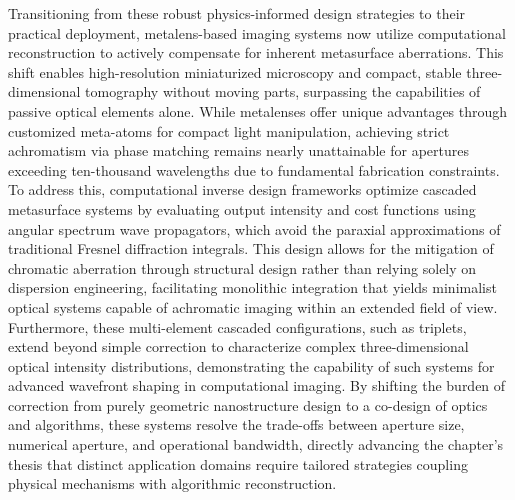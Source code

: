 Transitioning from these robust physics-informed design strategies to their practical deployment, metalens-based imaging systems now utilize computational reconstruction to actively compensate for inherent metasurface aberrations. This shift enables high-resolution miniaturized microscopy and compact, stable three-dimensional tomography without moving parts, surpassing the capabilities of passive optical elements alone. While metalenses offer unique advantages through customized meta-atoms for compact light manipulation, achieving strict achromatism via phase matching remains nearly unattainable for apertures exceeding ten-thousand wavelengths due to fundamental fabrication constraints. To address this, computational inverse design frameworks optimize cascaded metasurface systems by evaluating output intensity and cost functions using angular spectrum wave propagators, which avoid the paraxial approximations of traditional Fresnel diffraction integrals. \citep{doi_10_1364_oe_448757_33bdf93c} \citep{doi_10_1002_lpor_202401011_3926c17d} This design allows for the mitigation of chromatic aberration through structural design rather than relying solely on dispersion engineering, facilitating monolithic integration that yields minimalist optical systems capable of achromatic imaging within an extended field of view. Furthermore, these multi-element cascaded configurations, such as triplets, extend beyond simple correction to characterize complex three-dimensional optical intensity distributions, demonstrating the capability of such systems for advanced wavefront shaping in computational imaging. By shifting the burden of correction from purely geometric nanostructure design to a co-design of optics and algorithms, these systems resolve the trade-offs between aperture size, numerical aperture, and operational bandwidth, directly advancing the chapter's thesis that distinct application domains require tailored strategies coupling physical mechanisms with algorithmic reconstruction. \citep{doi_10_3788_pi_2023_c01_9f71817a} \citep{doi_10_1364_oe_27_030308_704a1c9b} \citep{doi_10_1038_s41377_026_02272_y_42e58df2}

